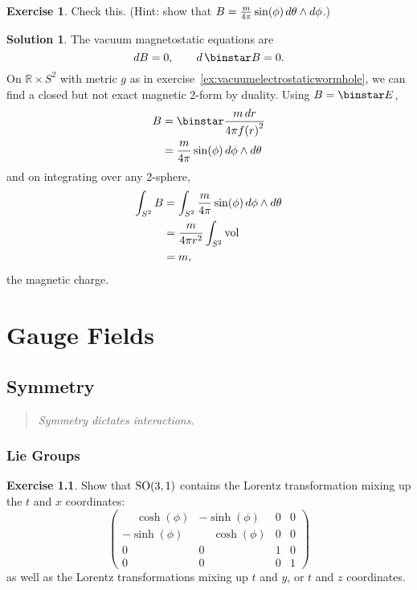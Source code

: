 \documentclass[11pt, a4paper]{report}
\theoremstyle{definition}
\newtheorem{exercise}{Exercise}[part]
\newtheorem{solution}{Solution}[part]
\newenvironment{ex}{\begin{exercise}}{\end{exercise}\pagebreak[1]}
\newenvironment{sol}{\begin{solution}}{\end{solution}\pagebreak[3]}
\newenvironment{epigraph}
    {\begin{quote}\small\itshape} %
    {\end{quote}\ignorespacesafterend\vspace{\parskip}}
\newcommand*{\SO}{\ensuremath\text{SO}}
\renewcommand*{\d}{\ensuremath\mathop{}\mathopen{}d}
\renewcommand*{\star}{\ensuremath\mathop{}\mathopen\binstar\mathord{}}
\begin{document}
\begin{ex}

Check this. (Hint: show that $B = \frac{m}{4 \pi} \sin(\phi) \d \theta \wedge d\phi$.)

\end{ex}

\begin{sol}

The vacuum magnetostatic equations are
\[
    dB = 0, \qquad
    d \star B = 0.
\]
On $\mathbb{R} \times S^2$ with metric $g$ as in exercise~\ref{ex:vacuumelectrostaticwormhole}, we can find a closed but not exact magnetic 2-form by duality. Using $B = \star E$,
\begin{align*}
    B &= \star \frac{m \d r}{4 \pi {f(r)}^2} \\
      &= \frac{m}{4 \pi} \sin(\phi) \d \phi \wedge d\theta
\end{align*}
and on integrating over any 2-sphere,
\begin{align*}
    \int_{S^2} B &= \int_{S^2} \frac{m}{4 \pi} \sin(\phi) \d \phi \wedge d\theta \\
        &= \frac{m}{4 \pi r^2} \int_{S^2} \text{vol} \\
        &= m,
\end{align*}
the magnetic charge.

\end{sol}

\part{Gauge Fields}

\chapter{Symmetry}

\begin{epigraph}
    Symmetry dictates interactions.
\end{epigraph}

\section{Lie Groups}\label{sec:liegroups}

\begin{ex}

Show that $\SO(3, 1)$ contains the Lorentz transformation mixing up the $t$ and $x$ coordinates:
\[
    \begin{pmatrix}
        \phantom{-}\cosh(\phi) & -\sinh(\phi)           & 0 & 0 \\
        -\sinh(\phi)           & \phantom{-}\cosh(\phi) & 0 & 0 \\
        0                      & 0                      & 1 & 0 \\
        0                      & 0                      & 0 & 1
    \end{pmatrix}
\]
as well as the Lorentz transformations mixing up $t$ and $y$, or $t$ and $z$ coordinates.

\end{ex}
\end{document}
